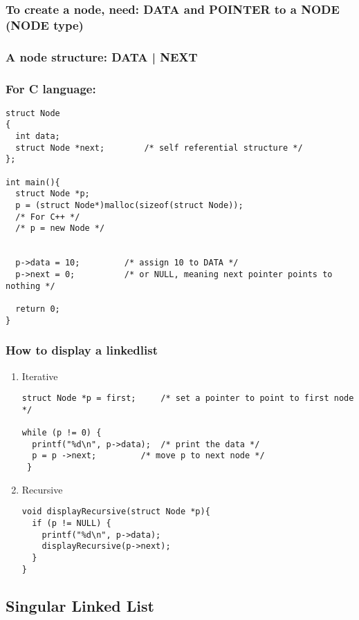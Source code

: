 \documentclass[11pt]{article}
\begin{document}
\subsubsection{To create a node, need: DATA and POINTER to a NODE (NODE type)}
\label{sec:orga64cc7c}
\subsubsection{A node structure:  DATA | NEXT}
\label{sec:org759fac9}
\subsubsection{For C language:}
\label{sec:orgaa80c08}
\begin{verbatim}
struct Node
{
  int data;
  struct Node *next;		/* self referential structure */
};

int main(){
  struct Node *p;
  p = (struct Node*)malloc(sizeof(struct Node));
  /* For C++ */
  /* p = new Node */


  p->data = 10; 		/* assign 10 to DATA */
  p->next = 0;			/* or NULL, meaning next pointer points to nothing */

  return 0;
}
\end{verbatim}
\subsubsection{How to display a linkedlist}
\label{sec:org228e0a4}
\begin{enumerate}
\item Iterative
\label{sec:orgbf3fab7}
\begin{verbatim}
struct Node *p = first;		/* set a pointer to point to first node */

while (p != 0) {
  printf("%d\n", p->data);	/* print the data */
  p = p ->next;			/* move p to next node */
 }
\end{verbatim}
\item Recursive
\label{sec:orgd9f2015}
\begin{verbatim}
void displayRecursive(struct Node *p){
  if (p != NULL) {
    printf("%d\n", p->data);
    displayRecursive(p->next);
  }
}
\end{verbatim}
\end{enumerate}
\subsection{Singular Linked List}
\label{sec:org8bf64d3}
\end{document}
